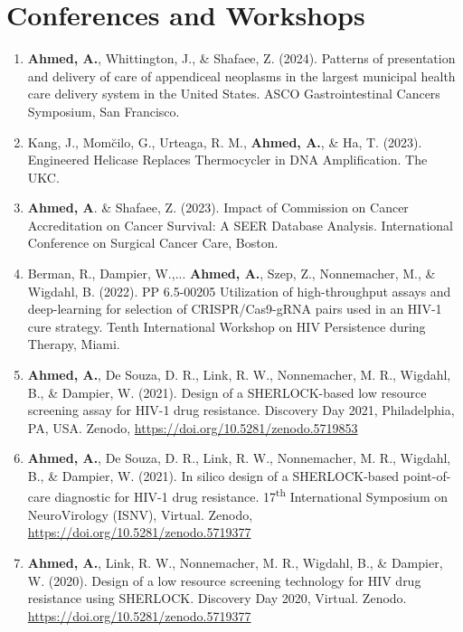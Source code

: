 \documentclass[letterpaper,11pt]{article}
\newcommand{\resumeItem}[2]{
  \item\small{
    \textbf{#1}{ #2 \vspace{-2pt}}
  }
}
\newcommand{\resumeSubItem}[2]{\resumeItem{#1}{#2}\vspace{-4pt}}
\begin{document}
\section{Conferences and Workshops}
  \begin{enumerate}[leftmargin=*]
  \resumeSubItem{}
    {\textbf{Ahmed, A.}, Whittington, J., \& Shafaee, Z. (2024). Patterns of presentation and delivery of care of appendiceal neoplasms in the largest municipal health care delivery system in the United States. ASCO Gastrointestinal Cancers Symposium, San Francisco.}
  \resumeSubItem{}
    {Kang, J., Mom\u cilo, G., Urteaga, R. M., \textbf{Ahmed, A.}, \& Ha, T. (2023). Engineered Helicase Replaces Thermocycler in DNA Amplification. The UKC.}
  \resumeSubItem{}
    {\textbf{Ahmed, A}. \& Shafaee, Z. (2023). Impact of Commission on Cancer Accreditation on Cancer Survival: A SEER Database Analysis. International Conference on Surgical Cancer Care, Boston.}
  \resumeSubItem{}
    {Berman, R., Dampier, W.,... \textbf{Ahmed, A.}, Szep, Z., Nonnemacher, M., \& Wigdahl, B. (2022). PP 6.5-00205 Utilization of high-throughput assays and deep-learning for selection of CRISPR/Cas9-gRNA pairs used in an HIV-1 cure strategy. Tenth International Workshop on HIV Persistence during Therapy, Miami.}
  \resumeSubItem{}
    {\textbf{Ahmed, A.}, De Souza, D. R., Link, R. W., Nonnemacher, M. R., Wigdahl, B., \& Dampier, W. (2021). Design of a SHERLOCK-based low resource screening assay for HIV-1 drug resistance. Discovery Day 2021, Philadelphia, PA, USA. Zenodo, \href{https://doi.org/10.5281/zenodo.5719853}{https://doi.org/10.5281/zenodo.5719853}}
  \resumeSubItem{}
    {\textbf{Ahmed, A.}, De Souza, D. R., Link, R. W., Nonnemacher, M. R., Wigdahl, B., \& Dampier, W. (2021). In silico design of a SHERLOCK-based point-of-care diagnostic for HIV-1 drug resistance. 17\textsuperscript{th} International Symposium on NeuroVirology (ISNV), Virtual. Zenodo, \href{https://doi.org/10.5281/zenodo.5719377}{https://doi.org/10.5281/zenodo.5719377}}
  \resumeSubItem{}{\textbf{Ahmed, A.}, Link, R. W., Nonnemacher, M. R., Wigdahl, B., \& Dampier, W. (2020). Design of a low resource screening technology for HIV drug resistance using SHERLOCK. Discovery Day 2020, Virtual. Zenodo. \href{https://doi.org/10.5281/zenodo.5719377}{https://doi.org/10.5281/zenodo.5719377}}
  \end{enumerate}
  \vspace{-4pt}

\end{document}
